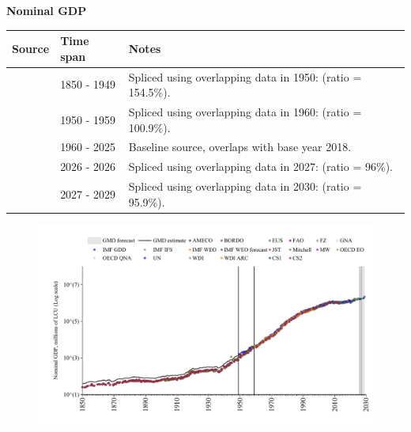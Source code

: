 \documentclass[12pt,a4paper,landscape]{article}
\begin{document}
\begin{adjustbox}{max totalsize={\paperwidth}{\paperheight},center}
\begin{minipage}[t][\textheight][t]{\textwidth}
\vspace*{0.5cm}
{}
\begin{center}
{\Large\bfseries Nominal GDP}
\end{center}
\vspace{0.5cm}
\begin{table}[H]
\centering
\small
\begin{tabular}{|l|l|l|}
\hline
\textbf{Source} & \textbf{Time span} & \textbf{Notes} \\
\hline
\rowcolor{white}\cite{CS2_ESP}& 1850 - 1949 &Spliced using overlapping data in 1950: (ratio = 154.5\%). \\
\rowcolor{lightgray}\cite{IMF_GDD}& 1950 - 1959 &Spliced using overlapping data in 1960: (ratio = 100.9\%). \\
\rowcolor{white}\cite{OECD_EO}& 1960 - 2025 &Baseline source, overlaps with base year 2018. \\
\rowcolor{lightgray}\cite{AMECO}& 2026 - 2026 &Spliced using overlapping data in 2027: (ratio = 96\%). \\
\rowcolor{white}\cite{IMF_WEO_forecast}& 2027 - 2029 &Spliced using overlapping data in 2030: (ratio = 95.9\%). \\
\hline
\end{tabular}
\end{table}
\begin{figure}[H]
\centering
\includegraphics[width=\textwidth,height=0.6\textheight,keepaspectratio]{graphs/ESP_nGDP.pdf}
\end{figure}
\end{minipage}
\end{adjustbox}
\end{document}
